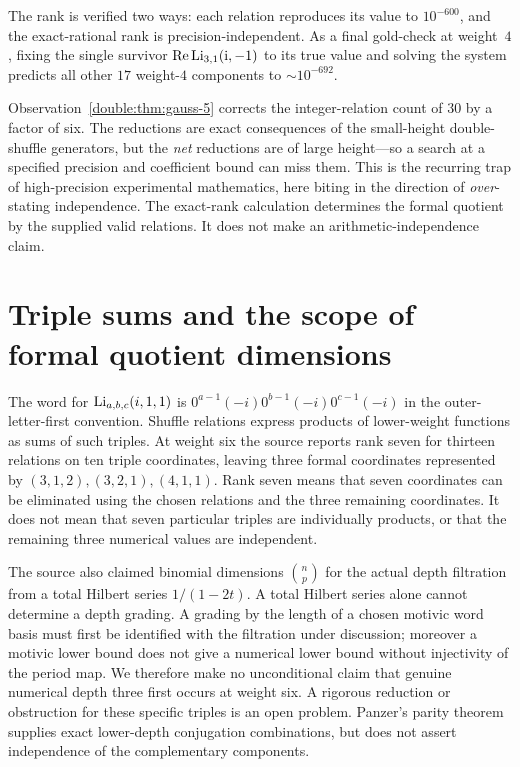 The rank is verified two ways: each relation reproduces its value to $10^{-600}$, and the
exact-rational rank is precision-independent. As a final gold-check at weight~$4$, fixing the single
survivor $\operatorname{Re}\operatorname{Li}_{3,1}(\mathrm{i},-1)$ to its true value and solving the system predicts all other $17$
weight-$4$ components to ${\sim}10^{-692}$.

\begin{remark}
Observation~\ref{double:thm:gauss-5} corrects the integer-relation count of $30$ by a factor of six. The
reductions are exact consequences of the small-height double-shuffle generators, but the
\emph{net} reductions are of large height---so a search at a specified precision and coefficient bound can miss them. This is the recurring trap of high-precision experimental
mathematics, here biting in the direction of \emph{over}-stating independence. The exact-rank calculation determines the formal quotient by the supplied valid relations. It does not make an arithmetic-independence claim.
\end{remark}

\section{Triple sums and the scope of formal quotient dimensions}
The word for $\operatorname{Li}_{a,b,c}(i,1,1)$ is
$0^{a-1}(-i)0^{b-1}(-i)0^{c-1}(-i)$ in the outer-letter-first convention.
Shuffle relations express products of lower-weight functions as sums of
such triples. At weight six the source reports rank seven for thirteen
relations on ten triple coordinates, leaving three formal coordinates
represented by $(3,1,2),(3,2,1),(4,1,1)$.
Rank seven means that seven coordinates can be eliminated using the
chosen relations and the three remaining coordinates. It does not mean
that seven particular triples are individually products, or that the
remaining three numerical values are independent.

The source also claimed binomial dimensions $\binom np$ for the actual
depth filtration from a total Hilbert series $1/(1-2t)$.
A total Hilbert series alone cannot determine a depth grading. A grading by
the length of a chosen motivic word basis must first be identified with the
filtration under discussion; moreover a motivic lower bound does not give
a numerical lower bound without injectivity of the period map.
We therefore make no unconditional claim that genuine numerical depth three
first occurs at weight six. A rigorous reduction or obstruction for these
specific triples is an open problem. Panzer's parity theorem~\cite{Panzer2017} supplies exact
lower-depth conjugation combinations, but does not assert independence of
the complementary components.

